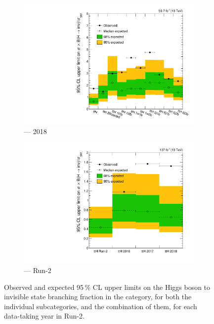 \begin{figure}[htbp]
    \begin{subfigure}[b]{0.45\textwidth}
        \includegraphics[width=\textwidth]{figures/limits/ttH/limit_2018_ttH.pdf}
        \caption{\ttH --- 2018}
    \end{subfigure}
    \hfill
    \begin{subfigure}[b]{0.45\textwidth}
        \includegraphics[width=\textwidth]{figures/limits/ttH/limit_Run2_ttH.pdf}
        \caption{\ttH --- Run-2}
    \end{subfigure}
    \caption[Observed and expected 95\,\% CL upper limits on the Higgs boson to invisible state branching fraction in the \ttH category, for both the individual subcategories, and the combination of them, for each data-taking year in Run-2]{Observed and expected 95\,\% CL upper limits on the Higgs boson to invisible state branching fraction in the \ttH category, for both the individual subcategories, and the combination of them, for each data-taking year in Run-2.}
    \label{fig:htoinv_limit_ttH}
\end{figure}

